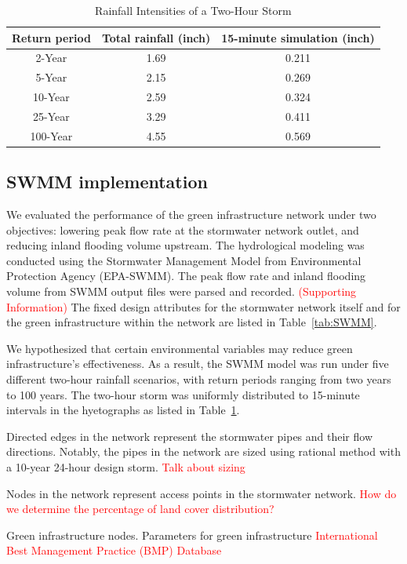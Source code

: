 \documentclass[draft]{agujournal2019}
\begin{document}
  \begin{table}
 \caption{Rainfall Intensities of a Two-Hour Storm}
 \label{tab:rainfall}
 \centering
 \begin{tabular}{c c c}
 \hline
Return period & Total rainfall (inch) & 15-minute simulation (inch) \\
 \hline
2-Year & 1.69 & 0.211 \\
5-Year & 2.15 & 0.269 \\
10-Year & 2.59 & 0.324 \\
25-Year & 3.29 & 0.411 \\
100-Year & 4.55 & 0.569 \\
 \hline
 \end{tabular}
 \end{table}
 
\subsection{SWMM implementation}
We evaluated the performance of the green infrastructure network under two objectives: lowering peak flow rate at the stormwater network outlet, and reducing inland flooding volume upstream. The hydrological modeling was conducted using the Stormwater Management Model from Environmental Protection Agency (EPA-SWMM). The peak flow rate and inland flooding volume from SWMM output files were parsed and recorded. \textcolor{red}{(Supporting Information)} The fixed design attributes for the stormwater network itself and for the green infrastructure within the network are listed in Table~\ref{tab:SWMM}. 

We hypothesized that certain environmental variables may reduce green infrastructure's effectiveness. As a result, the SWMM model was run under five different two-hour rainfall scenarios, with return periods ranging from two years to 100 years. The two-hour storm was uniformly distributed to 15-minute intervals in the hyetographs as listed in Table~\ref{tab:rainfall}.

Directed edges in the network represent the stormwater pipes and their flow directions. Notably, the pipes in the network are sized using rational method with a 10-year 24-hour design storm. \textcolor{red}{Talk about sizing}

Nodes in the network represent access points in the stormwater network. \textcolor{red}{How do we determine the percentage of land cover distribution?}

Green infrastructure nodes. Parameters for green infrastructure \textcolor{red}{International Best Management Practice (BMP) Database}
\end{document}
